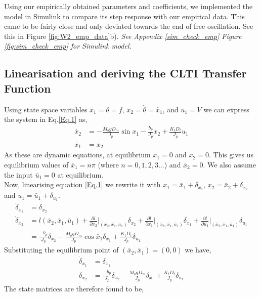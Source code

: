 \documentclass[11pt]{article}
\begin{document}
Using our empirically obtained parameters and coefficients, we implemented the model in Simulink to compare its step response with our empirical data. This came to be fairly close and only deviated towards the end of free oscillation. See this in Figure \ref{fig:W2_emp_data}b). \textit{See Appendix \ref{sim_check_emp} Figure \ref{fig:sim_check_emp} for Simulink model.}

\subsection{Linearisation and deriving the CLTI Transfer Function}
Using state space variables $x_1 = \theta = f$, $x_2 = \dot{\theta} = \dot{x_1}$, and $u_1 = V$ we can express the system in Eq.\ref{Eq.1} as,
\begin{align*}
    \dot{x_2} &= -\frac{M_b g D_m}{J_p}\sin x_1 - \frac{b_p}{J_p}x_2 + \frac{K_t D_t}{J_p}u_1\\
    \dot{x_1} &= x_2
\end{align*}
As these are dynamic equations, at equilibrium $\dot{x_1} = 0$ and $\dot{x_2} = 0$. This gives us equilibrium values of $\bar{x}_1 = n\pi$ (where $n = 0, 1, 2, 3$...) and $\bar{x}_2 = 0$. We also assume the input $\bar{u}_1 = 0$ at equilibrium.\\
Now, linearising equation \ref{Eq.1} we rewrite it with $x_1 = \bar{x}_1 + \delta_{x_1}$, $x_2 = \bar{x}_2 + \delta_{x_2}$ and $u_1 = \bar{u}_1 + \delta_{u_1}$.
\begin{align*}
    \dot{\delta}_{x_1} &= \delta_{x_2}\\
    \dot{\delta}_{x_2} &= l(\bar{x}_2, \bar{x}_1, \bar{u}_1) + \frac{\partial l}{\partial x_2} \Biggr|_{(\bar{x}_2, \bar{x}_1, \bar{u}_1)} \delta_{x_2} + \frac{\partial l}{\partial x_1} \Biggr|_{(\bar{x}_2, \bar{x}_1, \bar{u}_1)} \delta_{x_1} + \frac{\partial l}{\partial u_1} \Biggr|_{(\bar{x}_2, \bar{x}_1, \bar{u}_1)} \delta_{u_1}\\
    &= \frac{-b_p}{J_p}\delta_{x_2} - \frac{M_b g D_m}{J_p}\cos \bar{x}_1 \delta_{x_1} + \frac{K_t D_t}{J_p}\delta_{u_1}
\end{align*}
Substituting the equilibrium point of $ (\bar{x}_2,\bar{x}_1)=(0,0)$  we have,
\begin{align*}
    \dot{\delta}_{x_1} &= \delta_{x_2}\\
    \dot{\delta}_{x_2} &= \frac{-b_p}{J_p}\delta_{x_2} - \frac{M_b g D_m}{J_p} \delta_{x_1} + \frac{K_t D_t}{J_p}\delta_{u_1}
\end{align*}
The state matrices are therefore found to be, 
\end{document}
